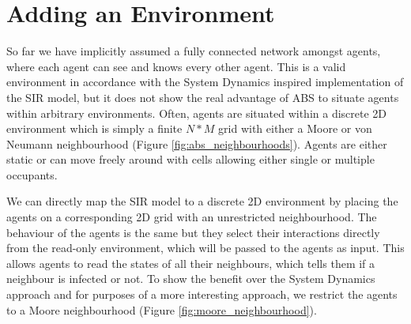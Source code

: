 \section{Adding an Environment}
\label{sec:adding_env}
So far we have implicitly assumed a fully connected network amongst agents, where each agent can see and knows every other agent. This is a valid environment in accordance with the System Dynamics inspired implementation of the SIR model, but it does not show the real advantage of ABS to situate agents within arbitrary environments. Often, agents are situated within a discrete 2D environment which is simply a finite $N*M$ grid with either a Moore or von Neumann neighbourhood (Figure \ref{fig:abs_neighbourhoods}). Agents are either static or can move freely around with cells allowing either single or multiple occupants.

We can directly map the SIR model to a discrete 2D environment by placing the agents on a corresponding 2D grid with an unrestricted neighbourhood. The behaviour of the agents is the same but they select their interactions directly from the read-only environment, which will be passed to the agents as input. This allows agents to read the states of all their neighbours, which tells them if a neighbour is infected or not. To show the benefit over the System Dynamics approach  and for purposes of a more interesting approach, we restrict the agents to a Moore neighbourhood (Figure \ref{fig:moore_neighbourhood}).

